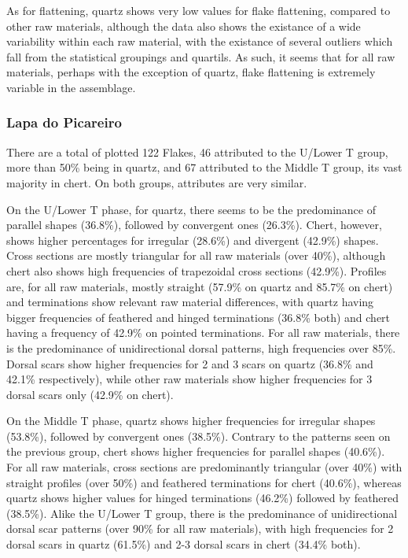 \documentclass[12pt,twoside]{reedthesis}
\begin{document}
As for flattening, quartz shows very low values for flake flattening, compared to other raw materials, although the data also shows the existance of a wide variability within each raw material, with the existance of several outliers which fall from the statistical groupings and quartils. As such, it seems that for all raw materials, perhaps with the exception of quartz, flake flattening is extremely variable in the assemblage.

\hypertarget{lapa-do-picareiro-5}{%
\subsubsection{Lapa do Picareiro}\label{lapa-do-picareiro-5}}

There are a total of plotted 122 Flakes, 46 attributed to the U/Lower T group, more than 50\% being in quartz, and 67 attributed to the Middle T group, its vast majority in chert. On both groups, attributes are very similar.

On the U/Lower T phase, for quartz, there seems to be the predominance of parallel shapes (36.8\%), followed by convergent ones (26.3\%). Chert, however, shows higher percentages for irregular (28.6\%) and divergent (42.9\%) shapes. Cross sections are mostly triangular for all raw materials (over 40\%), although chert also shows high frequencies of trapezoidal cross sections (42.9\%). Profiles are, for all raw materials, mostly straight (57.9\% on quartz and 85.7\% on chert) and terminations show relevant raw material differences, with quartz having bigger frequencies of feathered and hinged terminations (36.8\% both) and chert having a frequency of 42.9\% on pointed terminations. For all raw materials, there is the predominance of unidirectional dorsal patterns, high frequencies over 85\%. Dorsal scars show higher frequencies for 2 and 3 scars on quartz (36.8\% and 42.1\% respectively), while other raw materials show higher frequencies for 3 dorsal scars only (42.9\% on chert).

On the Middle T phase, quartz shows higher frequencies for irregular shapes (53.8\%), followed by convergent ones (38.5\%). Contrary to the patterns seen on the previous group, chert shows higher frequencies for parallel shapes (40.6\%). For all raw materials, cross sections are predominantly triangular (over 40\%) with straight profiles (over 50\%) and feathered terminations for chert (40.6\%), whereas quartz shows higher values for hinged terminations (46.2\%) followed by feathered (38.5\%). Alike the U/Lower T group, there is the predominance of unidirectional dorsal scar patterns (over 90\% for all raw materials), with high frequencies for 2 dorsal scars in quartz (61.5\%) and 2-3 dorsal scars in chert (34.4\% both).
\end{document}
